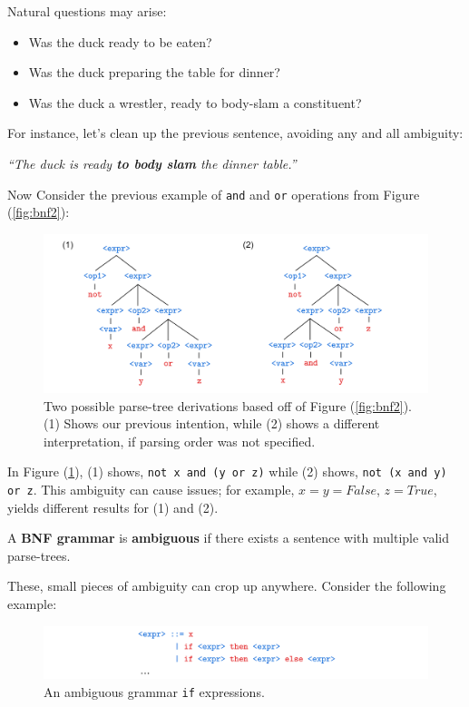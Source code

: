 \noindent
Natural questions may arise:
\begin{itemize}
    \item Was the duck ready to be eaten?
    \item Was the duck preparing the table for dinner?
    \item Was the duck a wrestler, ready to body-slam a constituent?
\end{itemize}
\noindent
For instance, let's clean up the previous sentence, avoiding any and all ambiguity:
\begin{center}
    \textit
    {``The duck is ready \textbf{to body slam} the dinner table.''}
\end{center}
\noindent
Now Consider the previous example of \texttt{and} and \texttt{or} operations from Figure (\ref{fig:bnf2}):
\begin{figure}[h]
    \centering
    \includegraphics[width=1\textwidth]{Sections/Formal/amb.png}
    \caption{Two possible parse-tree derivations based off of Figure (\ref{fig:bnf2}). (1) Shows our previous intention, while (2) shows a different interpretation, if parsing order was not specified.}
    \label{fig:amb}
\end{figure}

\newpage

\noindent
In Figure (\ref{fig:amb}), (1) shows, \texttt{\textcolor{Wine}{not x and (y or z)}} while (2) shows, \texttt{\textcolor{Wine}{not (x and y) or z}}. This ambiguity can cause issues; for example, 
$x=y=False$, $z=True$, yields different results for (1) and (2). \\

\begin{Def}

    A \textbf{BNF grammar} is \textbf{ambiguous} if there exists a sentence with multiple valid parse-trees.
\end{Def}
    
\noindent
These, small pieces of ambiguity can crop up anywhere. Consider the following example:
\begin{figure}[h]
    \centering
    \includegraphics[width=1\textwidth]{Sections/Formal/amb2.png}
    \caption{An ambiguous grammar \texttt{if} expressions.}
    \label{fig:amb2}
\end{figure}

